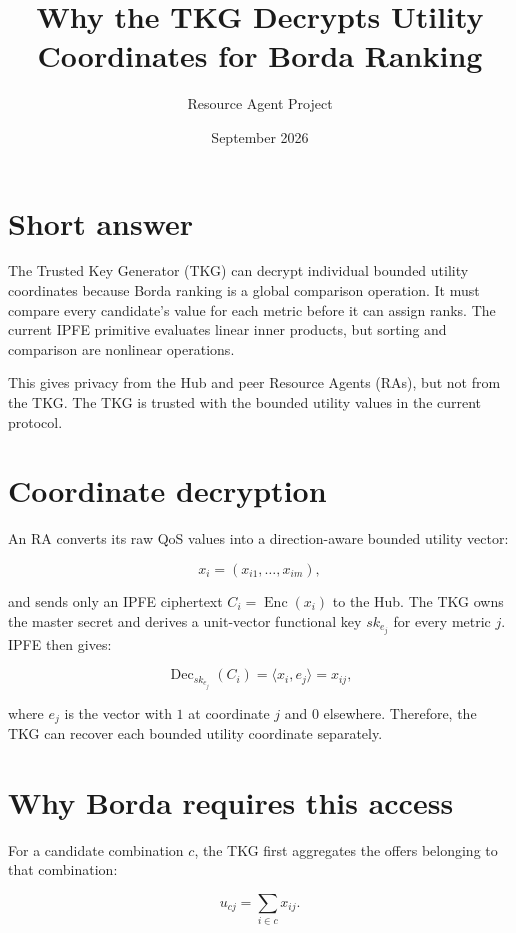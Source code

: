 \documentclass[11pt,a4paper]{article}
\title{Why the TKG Decrypts Utility Coordinates for Borda Ranking}
\author{Resource Agent Project}
\date{September 2026}
\begin{document}
\maketitle

\section{Short answer}

The Trusted Key Generator (TKG) can decrypt individual bounded utility
coordinates because Borda ranking is a global comparison operation. It must
compare every candidate's value for each metric before it can assign ranks.
The current IPFE primitive evaluates linear inner products, but sorting and
comparison are nonlinear operations.

This gives privacy from the Hub and peer Resource Agents (RAs), but not from
the TKG. The TKG is trusted with the bounded utility values in the current
protocol.

\section{Coordinate decryption}

An RA converts its raw QoS values into a direction-aware bounded utility vector:

\[
  x_i=(x_{i1},\ldots,x_{im}),
\]

and sends only an IPFE ciphertext $C_i=\operatorname{Enc}(x_i)$ to the Hub.
The TKG owns the master secret and derives a unit-vector functional key
$sk_{e_j}$ for every metric $j$. IPFE then gives:

\begin{equation}
  \operatorname{Dec}_{sk_{e_j}}(C_i)
  =\langle x_i,e_j\rangle
  =x_{ij},
\end{equation}

where $e_j$ is the vector with $1$ at coordinate $j$ and $0$ elsewhere.
Therefore, the TKG can recover each bounded utility coordinate separately.

\section{Why Borda requires this access}

For a candidate combination $c$, the TKG first aggregates the offers belonging
to that combination:

\begin{equation}
  u_{cj}=\sum_{i\in c}x_{ij}.
\end{equation}
\end{document}
